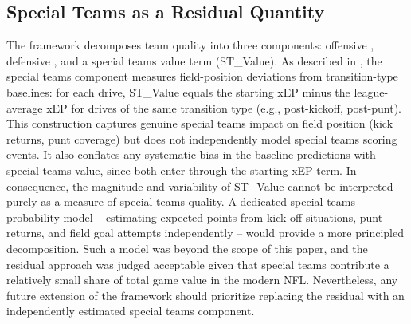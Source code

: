 \subsection{Special Teams as a Residual Quantity}
\label{sec:lim-special-teams}

The \gds{} framework decomposes team quality into three components:
offensive \xvoa{}, defensive \xvoa{}, and a special teams value term
(ST\_Value). As described in , the special teams component
measures field-position deviations from transition-type baselines: for each
drive, ST\_Value equals the starting \xscore{} xEP minus the league-average xEP
for drives of the same transition type (e.g., post-kickoff, post-punt). This
construction captures genuine special teams impact on field position (kick
returns, punt coverage) but does not independently model special teams scoring
events. It also conflates any systematic bias in the \xscore{} baseline
predictions with special teams value, since both enter through the starting
xEP term. In consequence, the magnitude and
variability of ST\_Value cannot be interpreted purely as a measure of special
teams quality. A dedicated special teams probability model -- estimating expected
points from kick-off situations, punt returns, and field goal attempts
independently -- would provide a more principled decomposition. Such a model was
beyond the scope of this paper, and the residual approach was judged acceptable
given that special teams contribute a relatively small share of total game value
in the modern NFL. Nevertheless, any future extension of the \gds{} framework
should prioritize replacing the residual with an independently estimated special
teams component.

